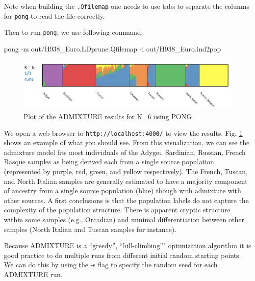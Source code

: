 \documentclass{svmult}       %
\newenvironment{Shaded}{\begin{snugshade}}{\end{snugshade}}
\newcommand{\KeywordTok}[1]{\textcolor[rgb]{0.13,0.29,0.53}{\textbf{#1}}}
\newcommand{\DataTypeTok}[1]{\textcolor[rgb]{0.13,0.29,0.53}{#1}}
\newcommand{\CommentTok}[1]{\textcolor[rgb]{0.56,0.35,0.01}{\textit{#1}}}
\newcommand{\FunctionTok}[1]{\textcolor[rgb]{0.00,0.00,0.00}{#1}}
\newcommand{\VariableTok}[1]{\textcolor[rgb]{0.00,0.00,0.00}{#1}}
\newcommand{\ExtensionTok}[1]{#1}
\newcommand{\NormalTok}[1]{#1}
\begin{document}
Note when building the \texttt{.Qfilemap} one needs to use tabs to
separate the columns for \texttt{pong} to read the file correctly.

Then to run \texttt{pong}, we use following command:

\begin{Shaded}
\begin{Highlighting}[]
\ExtensionTok{pong}\NormalTok{ -m out/H938_Euro.LDprune.Qfilemap -i out/H938_Euro.ind2pop}
\end{Highlighting}
\end{Shaded}


\begin{figure}
    \includegraphics[width=1\linewidth]{Figures/Figure2} \caption{Plot of the ADMIXTURE results for K=6 using PONG.}\label{fig:Fig2}
\end{figure}

We open a web browser to \texttt{http://localhost:4000/} to view the
results. Fig. \ref{fig:Fig2} shows an example of what you should see.
From this visualization, we can see the admixture model fits most
individuals of the Adygei, Sardinian, Russian, French Basque samples as
being derived each from a single source population (represented by
purple, red, green, and yellow respectively). The French, Tuscan, and
North Italian samples are generally estimated to have a majority
component of ancestry from a single source population (blue) though with
admixture with other sources. A first conclusions is that the population
labels do not capture the complexity of the population structure. There
is apparent cryptic structure within some samples (e.g., Orcadian) and
minimal differentiation between other samples (North Italian and Tuscan
samples for instance).

Because ADMIXTURE is a ``greedy'', ``hill-climbing''" optimization
algorithm it is good practice to do multiple runs from different initial
random starting points. We can do this by using the -s flag to specify
the random seed for each ADMIXTURE run.

\begin{Shaded}
\end{Shaded}
\end{document}
